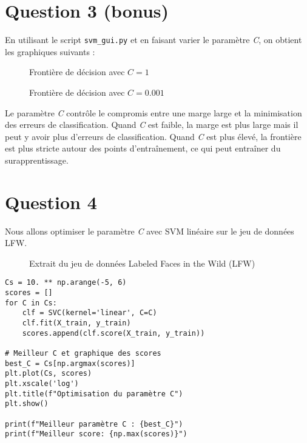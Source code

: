 \documentclass[a4paper,12pt]{article}
\begin{document}
\section*{Question 3 (bonus)}

En utilisant le script \texttt{svm\_gui.py} et en faisant varier le paramètre \textit{C}, on obtient les graphiques suivants :

\begin{figure}[H]
\centering
\begin{minipage}[b]{0.9\textwidth}
    
    \caption{Frontière de décision avec $C=1$}
\end{minipage}
\hfill
\begin{minipage}[b]{0.9\textwidth}
    
    \caption{Frontière de décision avec $C=0.001$}
\end{minipage}
\end{figure}

Le paramètre \textit{C} contrôle le compromis entre une marge large et la minimisation des erreurs de classification. Quand \textit{C} est faible, la marge est plus large mais il peut y avoir plus d'erreurs de classification. Quand \textit{C} est plus élevé, la frontière est plus stricte autour des points d'entraînement, ce qui peut entraîner du surapprentissage.

\section*{Question 4}

Nous allons optimiser le paramètre \textit{C} avec SVM linéaire sur le jeu de données LFW.

\begin{figure}[H]
\centering

\caption{Extrait du jeu de données Labeled Faces in the Wild (LFW)}
\end{figure}

\begin{verbatim}
Cs = 10. ** np.arange(-5, 6)
scores = []
for C in Cs:
    clf = SVC(kernel='linear', C=C)
    clf.fit(X_train, y_train)
    scores.append(clf.score(X_train, y_train))

# Meilleur C et graphique des scores
best_C = Cs[np.argmax(scores)]
plt.plot(Cs, scores)
plt.xscale('log')
plt.title(f"Optimisation du paramètre C")
plt.show()

print(f"Meilleur paramètre C : {best_C}")
print(f"Meilleur score: {np.max(scores)}")
\end{verbatim}
\end{document}
